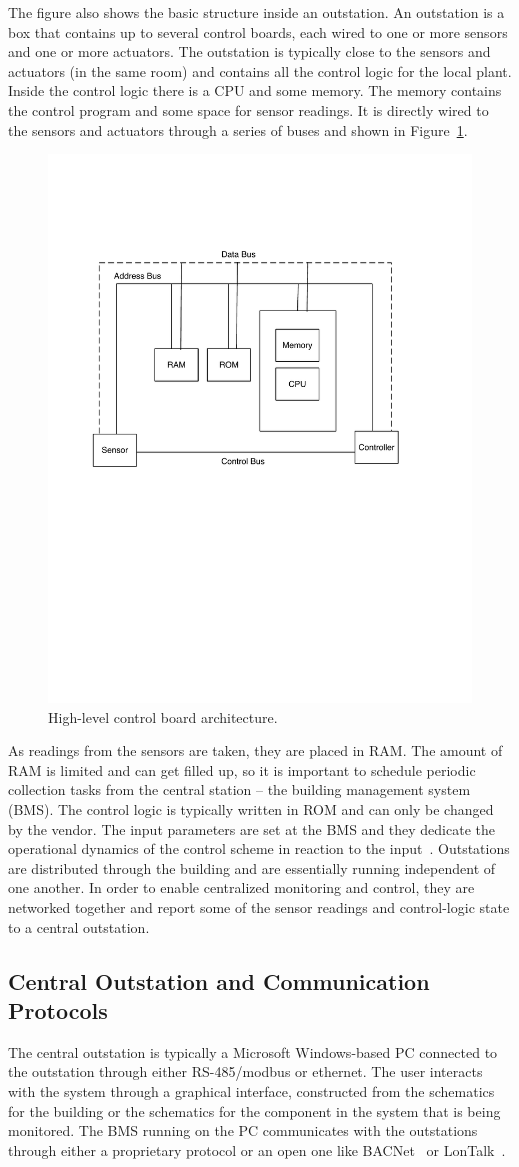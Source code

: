The figure also shows the basic structure inside an outstation.  An outstation is a box that contains up to several control boards, each
wired to one or more sensors and one or more actuators.  The outstation is typically close to the sensors and actuators (in the same room)
and contains all the control logic for the local plant.  Inside the control logic there is a CPU and some memory.  The memory
contains the control program and some space for sensor readings.  It is directly wired to the sensors and actuators through
a series of buses and shown in Figure~\ref{fig:control_box}.

\begin{figure}[t!] %
\centering
\includegraphics[width=0.50\columnwidth]{figs/control_box}
\caption{High-level control board architecture.}
\label{fig:control_box}
\end{figure}

As readings from the sensors are taken, they are placed in RAM.  The amount of RAM is limited and can get filled up, so it is important
to schedule periodic collection tasks from the central station -- the building management system (BMS).  The control logic is typically
written in ROM and can only be changed by the vendor.  The input parameters are set at the BMS and they dedicate the operational dynamics
of the control scheme in reaction to the input~\cite{BMS_book}.
Outstations are distributed through the building and are essentially running independent of one another.  In order to enable centralized 
monitoring and control, they are networked together and report some of the sensor readings and control-logic state to a central outstation.

\subsection{Central Outstation and Communication Protocols}
The central outstation is typically a Microsoft Windows-based PC connected to the outstation through either RS-485/modbus or ethernet.
The user interacts with the system through a graphical interface, constructed from the schematics for the building or the schematics
for the component in the system that is being monitored.  The BMS running on the PC communicates with the outstations through either a 
proprietary protocol or an open one like BACNet~\cite{Bacnet} or LonTalk~\cite{LonTalk}.

